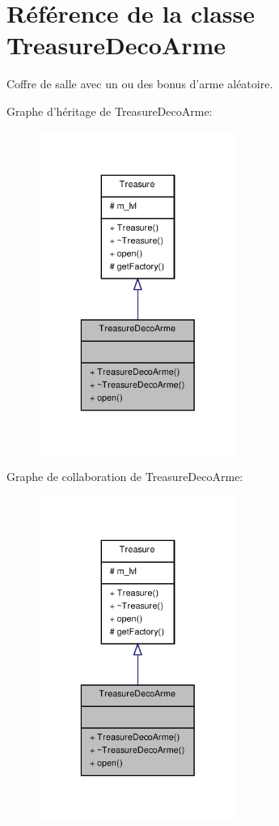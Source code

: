 \hypertarget{class_treasure_deco_arme}{\section{Référence de la classe Treasure\-Deco\-Arme}
\label{class_treasure_deco_arme}
}


Coffre de salle avec un ou des bonus d'arme aléatoire.  




Graphe d'héritage de Treasure\-Deco\-Arme\-:
\nopagebreak
\begin{figure}[H]
\begin{center}
\leavevmode
\includegraphics[width=184pt]{class_treasure_deco_arme__inherit__graph}
\end{center}
\end{figure}


Graphe de collaboration de Treasure\-Deco\-Arme\-:
\nopagebreak
\begin{figure}[H]
\begin{center}
\leavevmode
\includegraphics[width=184pt]{class_treasure_deco_arme__coll__graph}
\end{center}
\end{figure}
